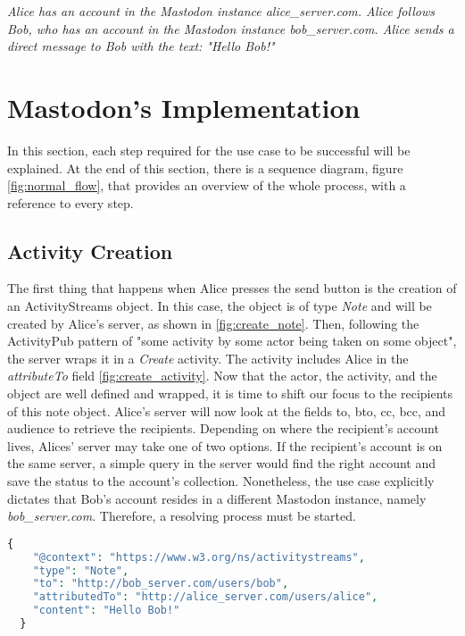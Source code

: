 \emph{Alice has an account in the Mastodon instance alice\_server.com. Alice follows Bob, who has an account in the Mastodon instance bob\_server.com. Alice sends a direct message to Bob with the text: "Hello Bob!" }

\pagebreak

\section{Mastodon's Implementation}
In this section, each step required for the use case to be successful will be explained. At the end of this section, there is a sequence diagram, figure \ref{fig:normal_flow}, that provides an overview of the whole process, with a reference to every step. 

\subsection{Activity Creation}
The first thing that happens when Alice presses the send button is the creation of an ActivityStreams object. In this case, the object is of type \emph{Note} and will be created by Alice's server, as shown in \ref{fig:create_note}. Then, following the ActivityPub pattern of "some activity by some actor being taken on some object"\cite{lemmer-webber_tallon_guy_prodromou_2018}, the server wraps it in a \emph{Create} activity. The activity includes Alice in the \emph{attributeTo} field \ref{fig:create_activity}. Now that the actor, the activity, and the object are well defined and wrapped, it is time to shift our focus to the recipients of this note object. 
Alice's server will now look at the fields to, bto, cc, bcc, and audience to retrieve the recipients. Depending on where the recipient's account lives, Alices' server may take one of two options. If the recipient's account is on the same server, a simple query in the server would find the right account and save the status to the account's collection. Nonetheless, the use case explicitly dictates that Bob's account resides in a different Mastodon instance, namely \emph{bob\_server.com}. Therefore, a resolving process must be started.

\lstset{style=JSONStyle}
\begin{lstlisting}[language=PHP, caption=ActivityStreams note object, label=fig:create_note]
  {
    "@context": "https://www.w3.org/ns/activitystreams",
    "type": "Note",
    "to": "http://bob_server.com/users/bob",
    "attributedTo": "http://alice_server.com/users/alice",
    "content": "Hello Bob!"
  }
\end{lstlisting}

